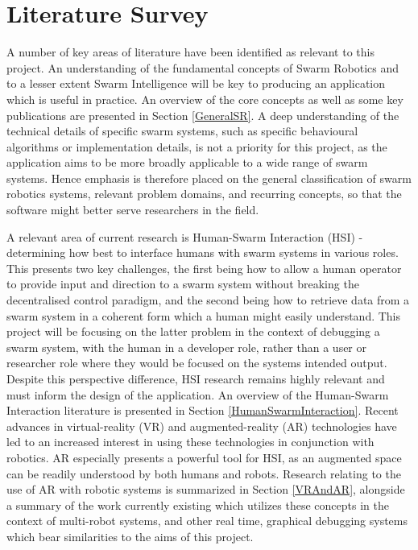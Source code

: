 \documentclass[titlepage,hidelinks,10pt]{article}
\begin{document}
\section{Literature Survey} \label{LitSurvey}
A number of key areas of literature have been identified as relevant to this project. An understanding of the fundamental concepts of Swarm Robotics and to a lesser extent Swarm Intelligence will be key to producing an application which is useful in practice. An overview of the core concepts as well as some key publications are presented in Section \ref{GeneralSR}. A deep understanding of the technical details of specific swarm systems, such as specific behavioural algorithms or implementation details, is not a priority for this project, as the application aims to be more broadly applicable to a wide range of swarm systems. Hence emphasis is therefore placed on the general classification of swarm robotics systems, relevant problem domains, and recurring concepts, so that the software might better serve researchers in the field.

A relevant area of current research is Human-Swarm Interaction (HSI) - determining how best to interface humans with swarm systems in various roles. This presents two key challenges, the first being how to allow a human operator to provide input and direction to a swarm system without breaking the decentralised control paradigm, and the second being how to retrieve data from a swarm system in a coherent form which a human might easily understand. This project will be focusing on the latter problem in the context of debugging a swarm system, with the human in a developer role, rather than a user or researcher role where they would be focused on the systems intended output. Despite this perspective difference, HSI research remains highly relevant and must inform the design of the application. An overview of the Human-Swarm Interaction literature is presented in Section \ref{HumanSwarmInteraction}. Recent advances in virtual-reality (VR) and augmented-reality (AR) technologies have led to an increased interest in using these technologies in conjunction with robotics. AR especially presents a powerful tool for HSI, as an augmented space can be readily understood by both humans and robots. Research relating to the use of AR with robotic systems is summarized in Section \ref{VRAndAR}, alongside a summary of the work currently existing which utilizes these concepts in the context of multi-robot systems, and other real time, graphical debugging systems which bear similarities to the aims of this project.
\end{document}
